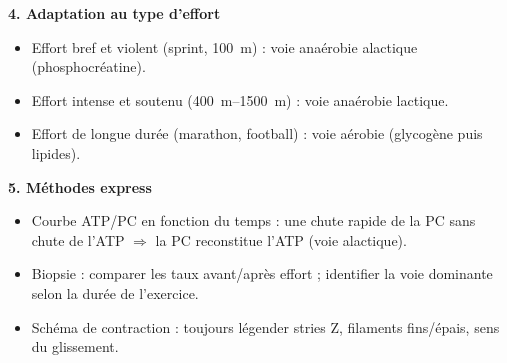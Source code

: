 \documentclass[11pt]{article}
\newcommand{\cle}[1]{{\popxbold\color{popdark}#1}}
\begin{document}
\begin{bilan}
\textbf{4. Adaptation au type d'effort}
\begin{itemize}
  \item \cle{Effort bref et violent} (sprint, \SI{100}{m}) : voie anaérobie alactique (phosphocréatine).
  \item \cle{Effort intense et soutenu} (\SI{400}{m}--\SI{1500}{m}) : voie anaérobie lactique.
  \item \cle{Effort de longue durée} (marathon, football) : voie aérobie (glycogène puis lipides).
\end{itemize}

\textbf{5. Méthodes express}
\begin{itemize}
  \item Courbe ATP/PC en fonction du temps : une chute rapide de la PC sans chute de l'ATP $\Rightarrow$ la PC reconstitue l'ATP (voie alactique).
  \item Biopsie : comparer les taux avant/après effort ; identifier la voie dominante selon la durée de l'exercice.
  \item Schéma de contraction : toujours légender stries Z, filaments fins/épais, sens du glissement.
\end{itemize}
\end{bilan}
\end{document}
